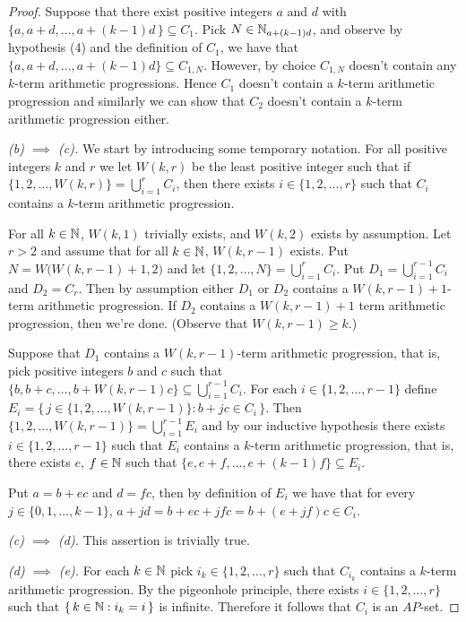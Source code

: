 \begin{proof}
  Suppose that there exist positive integers $a$ and $d$ with $\{a, a+d, \ldots, a+(k-1)d \,\} \subseteq C_1$. 
  Pick $N \in \mathbb{N}_{a+(k-1)d}$, and observe by hypothesis (4) and the definition of $C_1$, we have that $\{a, a+d, \ldots, a+(k-1)d\} \subseteq C_{1,N}$. 
  However, by choice $C_{1,N}$ doesn't contain any $k$-term arithmetic progressions. 
  Hence $C_1$ doesn't contain a $k$-term arithmetic progression and similarly we can show that $C_2$ doesn't contain a $k$-term arithmetic progression either. 

  \textsl{(b) $\implies$ (c).}
  We start by introducing some temporary notation.
  For all positive integers $k$ and $r$ we let $W(k,r)$ be the least positive integer such that if $\{1, 2, \ldots, W(k,r)\} = \bigcup_{i=1}^r C_i$, then there exists $i \in \{1, 2, \ldots, r\}$ such that $C_i$ contains a $k$-term arithmetic progression.

  For all $k \in \mathbb{N}$, $W(k, 1)$ trivially exists, and $W(k, 2)$ exists by assumption.
  Let $r > 2$ and assume that for all $k \in \mathbb{N}$, $W(k, r-1)$ exists. 
  Put $N = W\bigl( W(k, r-1)+1, 2 \bigr)$ and let $\{1, 2, \ldots, N\} = \bigcup_{i=1}^r C_i$. 
  Put $D_1 = \bigcup_{i=1}^{r-1} C_i$ and $D_2 = C_r$.
  Then by assumption either $D_1$ or $D_2$ contains a $W(k,r-1)+1$-term arithmetic progression.
  If $D_2$ contains a $W(k,r-1)+1$ term arithmetic progression, then we're done. 
  (Observe that $W(k,r-1) \ge k$.)

  Suppose that $D_1$ contains a $W(k,r-1)$-term arithmetic progression, that is, pick positive integers $b$ and $c$ such that $\{b, b+c, \ldots, b+W(k,r-1)c\} \subseteq \bigcup_{i=1}^{r-1} C_i$. 
  For each $i \in \{1, 2, \ldots, r-1\}$ define $E_i = \bigl\{\, j \in \{1, 2, \ldots, W(k,r-1) \} : b+jc \in C_i \,\bigr\}$.
  Then $\{1, 2, \ldots, W(k, r-1)\} = \bigcup_{i=1}^{r-1} E_i$ and by our inductive hypothesis there exists $i \in \{1, 2, \ldots, r-1\}$ such that $E_i$ contains a $k$-term arithmetic progression, that is, there exists $e$, $f \in \mathbb{N}$ such that $\{e, e+f, \ldots, e+(k-1)f\} \subseteq E_i$. 

  Put $a = b+ec$ and $d = fc$, then by definition of $E_i$ we have that for every $j \in \{0, 1, \ldots, k-1\}$, $a + jd = b + ec + jfc = b+(e+jf)c \in C_i$.
  
  
  \textsl{(c) $\implies$ (d).}
  This assertion is trivially true.

  \textsl{(d) $\implies$ (e).}
  For each $k \in \mathbb{N}$ pick $i_k \in \{1, 2, \ldots, r\}$ such that $C_{i_k}$ contains a $k$-term arithmetic progression. 
  By the pigeonhole principle, there exists $i \in \{1, 2, \ldots, r\}$ such that $\{\,k \in \mathbb{N} : i_k = i\,\}$ is infinite.
  Therefore it follows that $C_i$ is an $AP$-set.


\end{proof}

